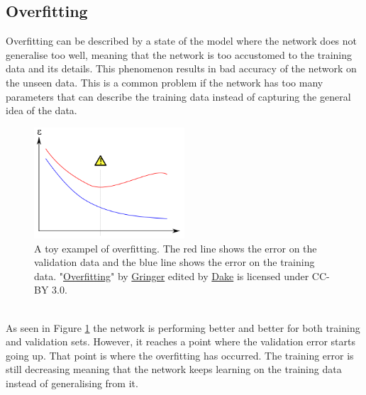 \subsection{Overfitting}\label{sec:overfitting}
Overfitting can be described by a state of the model where the network does not generalise too well, meaning that the network is too accustomed to the training data and its details. This phenomenon results in bad accuracy of the network on the unseen data. This is a common problem if the network has too many parameters that can describe the training data instead of capturing the general idea of the data.
\begin{figure}[h]
    \centering
    \includegraphics[width=0.5\textwidth]{figure/ann/overfitting}
    \caption{A toy exampel of overfitting. The red line shows the error on the validation data and the blue line shows the error on the training data. 
    "\href{https://en.wikipedia.org/wiki/Overfitting##/media/File:Overfitting_svg.svg}{Overfitting}" by
    \href{https://commons.wikimedia.org/wiki/User:Gringer}{Gringer} edited by
    \href{https://commons.wikimedia.org/wiki/User:Dake}{Dake} is licensed under CC-BY 3.0.}
    \label{fig:overfitting}
\end{figure}
\\
As seen in Figure \ref{fig:overfitting} the network is performing better and better for both training and validation sets. However, it reaches a point where the validation error starts going up. That point is where the overfitting has occurred. The training error is still decreasing meaning that the network keeps learning on the training data instead of generalising from it. 

